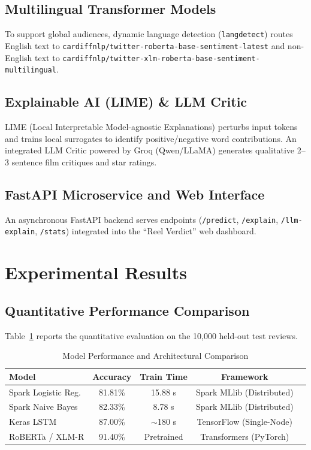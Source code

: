 \documentclass[conference]{IEEEtran}
\begin{document}
\subsection{Multilingual Transformer Models}
To support global audiences, dynamic language detection (\texttt{langdetect}) routes English text to \texttt{cardiffnlp/twitter-roberta-base-sentiment-latest} and non-English text to \texttt{cardiffnlp/twitter-xlm-roberta-base-sentiment-multilingual}.

\subsection{Explainable AI (LIME) \& LLM Critic}
LIME (Local Interpretable Model-agnostic Explanations) perturbs input tokens and trains local surrogates to identify positive/negative word contributions. An integrated LLM Critic powered by Groq (Qwen/LLaMA) generates qualitative 2--3 sentence film critiques and star ratings.

\subsection{FastAPI Microservice and Web Interface}
An asynchronous FastAPI backend serves endpoints (\texttt{/predict}, \texttt{/explain}, \texttt{/llm-explain}, \texttt{/stats}) integrated into the ``Reel Verdict'' web dashboard.

\section{Experimental Results}
\subsection{Quantitative Performance Comparison}
Table~\ref{tab:comparison} reports the quantitative evaluation on the 10,000 held-out test reviews.

\begin{table}[htbp]
\caption{Model Performance and Architectural Comparison}
\begin{center}
\begin{tabular}{lcccc}
\toprule
\textbf{Model} & \textbf{Accuracy} & \textbf{Train Time} & \textbf{Framework} \\
\midrule
Spark Logistic Reg. & 81.81\% & 15.88 s & Spark MLlib (Distributed) \\
Spark Naive Bayes   & 82.33\% & 8.78 s  & Spark MLlib (Distributed) \\
Keras LSTM          & 87.00\% & $\sim$180 s & TensorFlow (Single-Node) \\
RoBERTa / XLM-R     & 91.40\% & Pretrained & Transformers (PyTorch) \\
\bottomrule
\end{tabular}
\label{tab:comparison}
\end{center}
\end{table}
\end{document}
